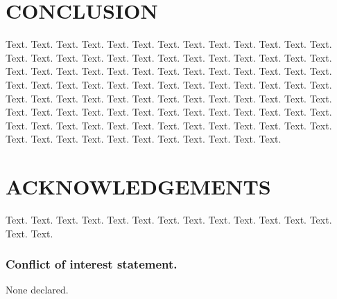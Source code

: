 \documentclass[a4,center,fleqn]{NAR}
\begin{document}
\section{CONCLUSION}

Text. Text. Text. Text. Text. Text. Text. Text. Text. Text. Text.
Text. Text. Text. Text. Text. Text. Text. Text. Text. Text. Text.
Text. Text. Text. Text. Text. Text. Text. Text. Text. Text. Text.
Text. Text. Text. Text. Text. Text. Text. Text. Text. Text. Text.
Text. Text. Text. Text. Text. Text. Text. Text. Text. Text. Text.
Text. Text. Text. Text. Text. Text. Text. Text. Text. Text. Text.
Text. Text. Text. Text. Text. Text. Text. Text. Text. Text. Text.
Text. Text. Text. Text. Text. Text. Text. Text. Text. Text. Text.
Text. Text. Text. Text. Text. Text. Text. Text. Text. Text. Text.
Text. Text. Text.


\section{ACKNOWLEDGEMENTS}

Text. Text. Text. Text. Text. Text. Text. Text. Text. Text. Text.
Text. Text. Text. Text.


\subsubsection{Conflict of interest statement.} None declared.





\end{document}
